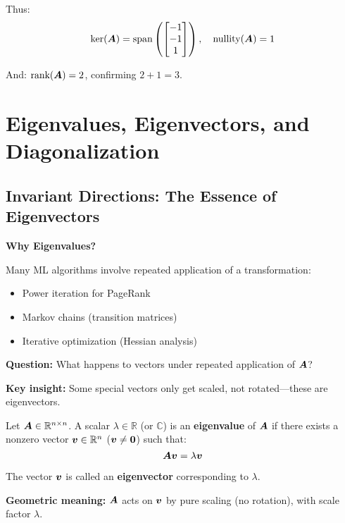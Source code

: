 \begin{example}
    Thus:
    \[
        \ker(\bm{A}) = \text{span}\left(\begin{bmatrix} -1 \\ -1 \\ 1 \end{bmatrix}\right), \quad \text{nullity}(\bm{A}) = 1
    \]

    And: $\text{rank}(\bm{A}) = 2$, confirming $2 + 1 = 3$.
\end{example}

\section{Eigenvalues, Eigenvectors, and Diagonalization}

\subsection{Invariant Directions: The Essence of Eigenvectors}

\begin{necessitybox}
    \textbf{Why Eigenvalues?}

    Many ML algorithms involve repeated application of a transformation:
    \begin{itemize}
        \item Power iteration for PageRank
        \item Markov chains (transition matrices)
        \item Iterative optimization (Hessian analysis)
    \end{itemize}

    \textbf{Question:} What happens to vectors under repeated application of $\bm{A}$?

    \textbf{Key insight:} Some special vectors only get scaled, not rotated—these are eigenvectors.
\end{necessitybox}

\begin{definition}
    \label{def:eigenvalue}
    Let $\bm{A} \in \mathbb{R}^{n \times n}$. A scalar $\lambda \in \mathbb{R}$ (or $\mathbb{C}$) is an \textbf{eigenvalue} of $\bm{A}$ if there exists a nonzero vector $\bm{v} \in \mathbb{R}^n$ ($\bm{v} \neq \bm{0}$) such that:
    \[
        \bm{A}\bm{v} = \lambda\bm{v}
    \]

    The vector $\bm{v}$ is called an \textbf{eigenvector} corresponding to
    $\lambda$.

    \textbf{Geometric meaning:} $\bm{A}$ acts on $\bm{v}$ by pure scaling (no rotation), with scale factor $\lambda$.
\end{definition}

